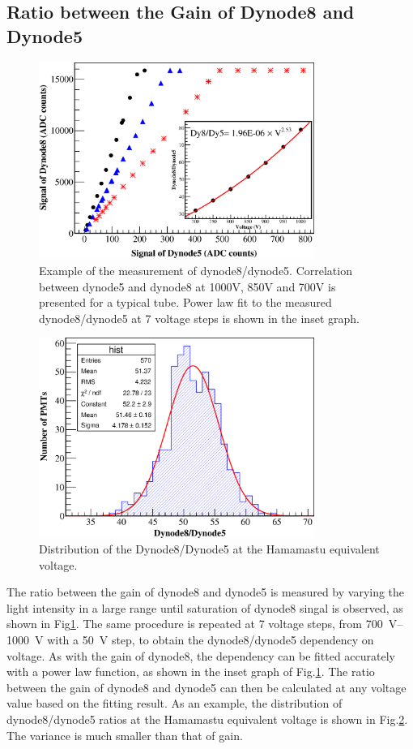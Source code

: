 \documentclass[5p, times]{elsarticle}
\begin{document}
\subsection{Ratio between the Gain of Dynode8 and Dynode5}
\label{sec:psd_dy58}

\begin{figure}
 \centering
 \includegraphics[width=90mm]{dy58_example}
\caption{Example of the measurement of dynode8/dynode5.
Correlation between dynode5 and dynode8 at 1000V, 850V and 700V is presented for a typical tube.
Power law fit to the measured dynode8/dynode5 at 7 voltage steps is shown in the inset graph.
}
\label{fig:dy58_example}
\end{figure} 

\begin{figure}
 \centering
 \includegraphics[width=90mm]{dy58_dist}
\caption{Distribution of the Dynode8/Dynode5 at the Hamamastu equivalent voltage.}
\label{fig:dy58_dist}
\end{figure} 

The ratio between the gain of dynode8 and dynode5 is measured by varying the light intensity in a large range until saturation of dynode8 singal is observed, as shown in Fig\ref{fig:dy58_example}.
The same procedure is repeated at 7 voltage steps, from \SIrange{700}{1000}{\volt} with a \SI{50}{\volt} step, to obtain the dynode8/dynode5 dependency on voltage.
As with the gain of dynode8, the dependency can be fitted accurately with a power law function, as shown in the inset graph of Fig.\ref{fig:dy58_example}.
The ratio between the gain of dynode8 and dynode5 can then be calculated at any voltage value based on the fitting result.
As an example, the distribution of dynode8/dynode5 ratios at the Hamamastu equivalent voltage is shown in Fig.\ref{fig:dy58_dist}.
The variance is much smaller than that of gain.
\end{document}
